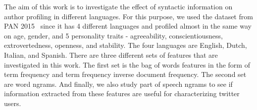 \documentclass[conference]{IEEEtran}
\begin{document}
The aim of this work is to investigate the effect of syntactic information on author profiling in different languages. For this purpose, we used the dataset from PAN 2015~\cite{rangel:2015} since it has 4 different languages and profiled almost in the same way on age, gender, and 5 personality traits - agreeability, conscientiousness, extrovertedness, openness, and stability. The four languages are English, Dutch, Italian, and Spanish. There are three different sets of features that are investigated in this work. The first set is the bag of words features in the form of term frequency and term frequency inverse document frequency. The second set are word ngrams. And finally, we also study part of speech ngrams to see if information extracted from these features are useful for characterizing twitter users.

%
%

\end{document}
